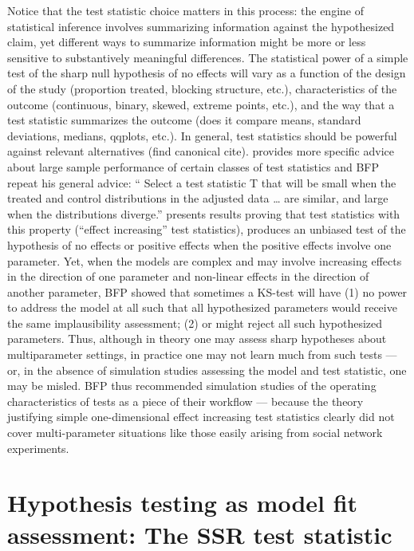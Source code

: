 Notice that the test statistic choice matters in this process: the engine of
statistical inference involves summarizing information against the
hypothesized claim, yet different ways to summarize information might be more
or less sensitive to substantively meaningful differences. The statistical
power of a simple test of the sharp null hypothesis of no effects will vary as
a function of the design of the study (proportion treated, blocking structure,
etc.), characteristics of the outcome (continuous, binary, skewed, extreme
points, etc.), and the way that a test statistic summarizes the outcome (does
it compare means, standard deviations, medians, qqplots, etc.). In general,
test statistics should be powerful against relevant alternatives (find
canonical cite). \citet[\S 2.4.4]{rosenbaum:2002} provides more specific
advice about large sample performance of certain classes of test statistics
and BFP repeat his general advice: `` Select a test statistic T that will be
small when the treated and control distributions in the adjusted data \ldots
are similar, and large when the distributions diverge.'' \citet[Proposition 4
and 5, \S 2.9]{rosenbaum:2002} presents results proving that test statistics
with this property (``effect increasing'' test statistics), produces an
unbiased test of the hypothesis of no effects or positive effects when the
positive effects involve one parameter.  Yet, when the models are complex and
may involve increasing effects in the direction of one parameter and
non-linear effects in the direction of another parameter, BFP showed that
sometimes a KS-test will have (1) no power to address the model at all such
that all hypothesized parameters would receive the same implausibility
assessment; (2) or might reject all such hypothesized parameters. Thus,
although in theory one may assess sharp hypotheses about multiparameter
settings, in practice one may not learn much from such tests --- or, in the
absence of simulation studies assessing the model and test statistic, one may
be misled. BFP thus recommended simulation studies of the operating
characteristics of tests as a piece of their workflow --- because  the theory
justifying simple one-dimensional effect increasing test statistics clearly
did not cover multi-parameter situations like those easily arising from social
network experiments.

\section{Hypothesis testing as model fit assessment: The SSR test statistic}

